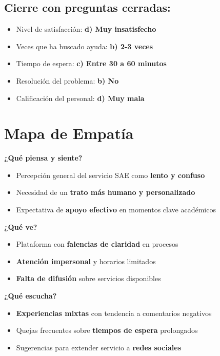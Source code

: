 \documentclass{article}
\begin{document}
\subsection*{Cierre con preguntas cerradas:}
\begin{itemize}
    \item Nivel de satisfacción: \textbf{d) Muy insatisfecho}
    \item Veces que ha buscado ayuda: \textbf{b) 2-3 veces}
    \item Tiempo de espera: \textbf{c) Entre 30 a 60 minutos}
    \item Resolución del problema: \textbf{b) No}
    \item Calificación del personal: \textbf{d) Muy mala}
\end{itemize}

\newpage

\section*{Mapa de Empatía}

\textbf{¿Qué piensa y siente?}
\begin{itemize}[leftmargin=*]
    \item Percepción general del servicio SAE como \textbf{lento y confuso}
    \item Necesidad de un \textbf{trato más humano y personalizado}
    \item Expectativa de \textbf{apoyo efectivo} en momentos clave académicos
\end{itemize}


\textbf{¿Qué ve?}
\begin{itemize}[leftmargin=*]
    \item Plataforma con \textbf{falencias de claridad} en procesos
    \item \textbf{Atención impersonal} y horarios limitados
    \item \textbf{Falta de difusión} sobre servicios disponibles
\end{itemize}

\textbf{¿Qué escucha?}
\begin{itemize}[leftmargin=*]
    \item \textbf{Experiencias mixtas} con tendencia a comentarios negativos
    \item Quejas frecuentes sobre \textbf{tiempos de espera} prolongados
    \item Sugerencias para extender servicio a \textbf{redes sociales}
\end{itemize}
\end{document}
